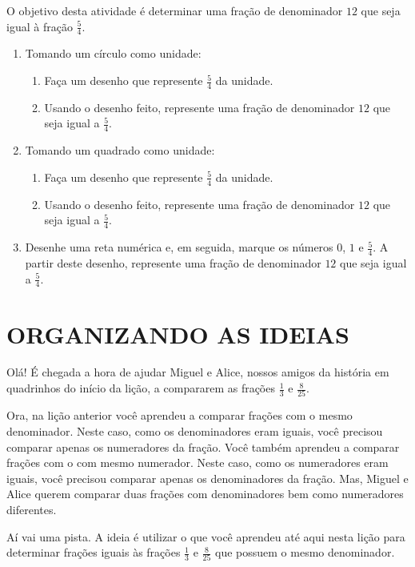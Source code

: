 \begin{atividade}{}

O objetivo desta atividade é determinar uma fração de denominador $12$ que seja igual à fração $\frac{5}{4}$.

\begin{enumerate}
  \item     Tomando um círculo como unidade:
\begin{enumerate}
  \item Faça um desenho que represente     $\frac{5}{4}$ da unidade.
  \item Usando o desenho feito, represente uma fração de denominador     $12$ que seja igual a     $\frac{5}{4}$.
\end{enumerate}
  \item     Tomando um quadrado como unidade:
  \begin{enumerate}
  \item Faça um desenho que represente     $\frac{5}{4}$ da unidade.
  \item Usando o desenho feito, represente uma fração de denominador     $12$ que seja igual a     $\frac{5}{4}$.
  \end{enumerate}
\item     Desenhe uma reta numérica e, em seguida, marque os números     $0$,     $1$ e     $\frac{5}{4}$. A partir deste desenho, represente uma fração de denominador     $12$ que seja igual a     $\frac{5}{4}$.
\end{enumerate} %
\end{atividade}

\section{ORGANIZANDO AS IDEIAS }

Olá! É chegada a hora de ajudar Miguel e Alice, nossos amigos da história em quadrinhos do início da lição, a compararem as frações $\frac{1}{3}$ e $\frac{8}{25}$.

Ora, na lição anterior você aprendeu a comparar frações com o mesmo denominador. Neste caso, como os denominadores eram iguais, você precisou comparar apenas os numeradores da fração. Você também aprendeu a comparar frações com o com mesmo numerador. Neste caso, como os numeradores eram iguais, você precisou comparar apenas os denominadores da fração. Mas, Miguel e Alice querem comparar duas frações com denominadores bem como numeradores diferentes.

Aí vai uma pista.  A ideia é utilizar o que você aprendeu até aqui nesta lição para determinar frações iguais às frações $\frac{1}{3}$ e $\frac{8}{25}$ que possuem o mesmo denominador.

